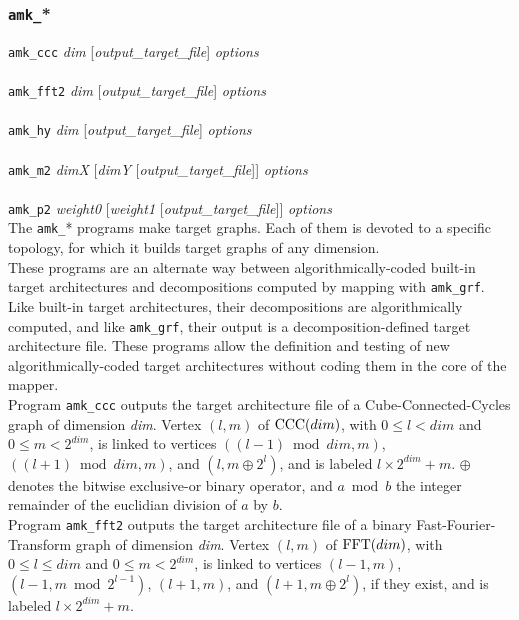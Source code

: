 \subsubsection{\texttt{amk\_}*}
\relax
\begin{itemize}
\progsyn
\texttt{amk\_ccc} {\it dim} [{\it output\_target\_file}] {\it options}\\
~\\
\texttt{amk\_fft2} {\it dim} [{\it output\_target\_file}] {\it options}\\
~\\
\texttt{amk\_hy} {\it dim} [{\it output\_target\_file}] {\it options}\\
~\\
\texttt{amk\_m2} {\it dimX} [{\it dimY} [{\it output\_target\_file}]] {\it options}\\
~\\
\texttt{amk\_p2} {\it weight0} [{\it weight1} [{\it output\_target\_file}]] {\it options}\\

\progdes
The \texttt{amk\_}* programs make target graphs.
Each of them is devoted to a specific topology, for which it builds target
graphs of any dimension.
\\
These programs are an alternate way between algorithmically-coded
built-in target architectures and decompositions computed by mapping
with \texttt{amk\_grf}.
Like built-in target architectures, their decompositions are
algorithmically computed, and like \texttt{amk\_grf}, their output is
a decomposition-defined target architecture file.
These programs allow the definition and testing of new algorithmically-coded
target architectures without coding them in the core of the mapper.
\\

\noi
Program \texttt{amk\_ccc} outputs the target architecture file of a
Cube-Connected-Cycles graph of dimension {\it dim}.
Vertex $(l,m)$ of ${\rm CCC}(dim)$, with $0 \leq l < dim$ and $0 \leq m < 2^{dim}$,
is linked to vertices $((l-1) \bmod dim, m)$, $((l+1) \bmod dim,m)$, and
$(l, m \oplus 2^l)$, and is labeled $l\times 2^{dim} + m$. $\oplus$ denotes
the bitwise exclusive-or binary operator, and $a \bmod b$ the integer
remainder of the euclidian division of $a$ by $b$.
\\

\noi
Program \texttt{amk\_fft2} outputs the target architecture file of a
binary Fast-Fourier-Transform graph of dimension {\it dim}.
Vertex $(l,m)$ of ${\rm FFT}(dim)$, with $0 \leq l \leq dim$ and
$0 \leq m < 2^{dim}$, is linked to vertices
$(l-1, m)$, $(l-1, m \bmod 2^{l-1})$, $(l+1, m)$, and $(l+1, m \oplus 2^l)$,
if they exist, and is labeled $l\times 2^{dim} + m$.
\\


\end{itemize}
